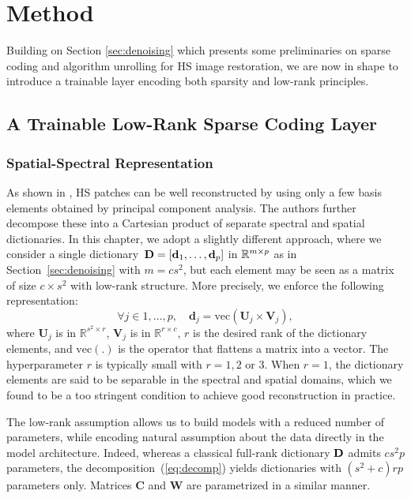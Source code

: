 \section{Method}

Building on Section \ref{sec:denoising} which presents some preliminaries on sparse coding and algorithm unrolling for HS image restoration, we are now in shape to introduce a trainable layer encoding both sparsity and low-rank principles.

\subsection{A Trainable Low-Rank Sparse Coding Layer}

\subsubsection{Spatial-Spectral Representation}

As shown in \cite{chakrabarti_statistics_2011, fu_adaptive_2015}, HS patches can be well reconstructed by using only a few basis elements obtained by principal component analysis. 
The authors further decompose these into a Cartesian product of separate spectral and spatial dictionaries.
In this chapter, we adopt a slightly different approach, where we consider
a single dictionary~$\mathbf D=[\mathbf d_1, \ldots, \mathbf d_p]$ in $\mathbb R^{m \times p}$ as in Section~\ref{sec:denoising} with $m = c s^2$, but each element may be seen as a matrix of size $c \times s^2$ with low-rank structure. 
More precisely, we enforce the following representation:
\begin{equation}
	\label{eq:decomp}
	\forall j \in 1,\ldots,p, \quad \mathbf{d}_j = \text{vec}\left( \mathbf{U}_j \times \mathbf{V}_j\right),
\end{equation}
where $ \mathbf{U}_j$ is  in $\mathbb{R}^{s^2 \times r} $, $ \mathbf{V}_j$ is  in $\mathbb{R}^{r \times c} $, $r$ is the desired rank of the dictionary elements, and $\text{vec}(.)$ is the operator that flattens a matrix into a vector.
The hyperparameter $r$ is typically small with $r=1,2$ or $3$.  
When $r=1$, the dictionary elements are said to be separable in the spectral and spatial domains, which we found to be a too stringent condition to achieve good reconstruction in practice.

The low-rank assumption allows us to build models with a reduced number of parameters, while encoding natural assumption about the data directly in the model architecture. 
Indeed, whereas a classical full-rank dictionary $\mathbf D$ admits $cs^2p$ parameters, the decomposition~(\ref{eq:decomp}) yields dictionaries with $(s^2 + c)rp$ parameters only.
Matrices $ \mathbf{C}$ and $ \mathbf{W}$ are parametrized in a similar manner.

